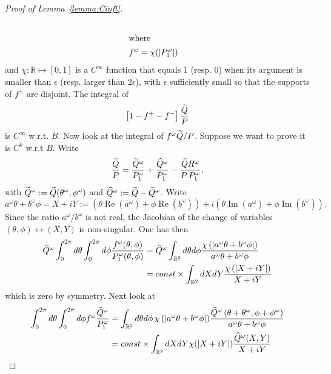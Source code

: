 \documentclass[AHL,Unicode,longabstracts,published]{cedram}
\newcommand{\bbR}{\mathbb{R}}
\DeclareMathOperator{\Rell}{Re}
\DeclareMathOperator{\Imm}{Im}
\let\oldtilde\tilde
\renewcommand*{\tilde}[1]{\mathchoice{\widetilde{#1}}{\widetilde{#1}}{\oldtilde{#1}}{\oldtilde{#1}}}
\let\oldhat\hat
\renewcommand*{\hat}[1]{\mathchoice{\widehat{#1}}{\widehat{#1}}{\oldhat{#1}}{\oldhat{#1}}}
\begin{document}
\begin{proof}[{Proof of Lemma~\ref{lemma:Cinft}}]
\begin{align}
\\
\intertext{where}
f^\omega &=\chi(|P^\omega_1|)
\end{align}
and $\chi:\bbR\mapsto [0,1]$ is a $C^\infty$ function that equals $1$ (resp. $0$) when its argument is smaller than $\epsilon$ (resp. larger than $2\epsilon$), with $\epsilon$ sufficiently small so that the supports of $f^\pm$ are disjoint. The integral of
\begin{equation}
\left[1-f^+-f^-\right]\frac{\tilde Q}P
\end{equation}
is $C^\infty$ w.r.t. $B$. Now look at the integral of $f^\omega \tilde Q/P$. Suppose we want to prove it is $C^k$ w.r.t $B$. Write
\begin{equation}\label{eq:Taylor}
\frac{\tilde Q}P=\frac{\tilde Q^\omega}{P^\omega_1}+\frac{\hat Q^\omega}{P^\omega_1}- \frac {\tilde Q R^\omega} { P\,P^\omega_1},
\end{equation}
with $\tilde Q^\omega:=\tilde Q(\theta^\omega,\phi^\omega)$ and $\hat Q^\omega:=\tilde Q-\tilde Q^\omega$. Write
\begin{equation}
a^\omega\theta+b^\omega\phi=X+i Y:=(\theta\Rell (a^\omega)+\phi\Rell(b^\omega))+i \left(\theta\Imm (a^\omega)+\phi\Imm(b^\omega)\right).
\end{equation}
Since the ratio $a^\omega/b^\omega$ is not real, the Jacobian of the change of variables $(\theta,\phi)\leftrightarrow (X,Y)$ is non-singular. One has then
\begin{equation}
\begin{aligned}
\tilde Q^\omega \int_0^{2\pi} d\theta \int_0^{2\pi}d\phi\frac{f^\omega(\theta,\phi)}{P^\omega_1(\theta,\phi)} &=\tilde Q^\omega\int_{\bbR^2} d\theta d\phi \frac{\chi\left(\left|a^\omega \theta+b^\omega\phi\right|\right) }{a^\omega\theta+b^\omega\phi}
\\ &=const\times \int_{\bbR^2} dX dY \frac{\chi\left(\left|X+i Y\right|\right)}{X+i Y}
\end{aligned}
\end{equation}
which is zero by symmetry. Next look at
\begin{align}
\int_0^{2\pi} d\theta \int_0^{2\pi}d\phi {f^\omega }\frac{\hat Q^\omega}{P^\omega_1}
&=\int_{\bbR^2} d\theta d\phi\,{\chi\left(\left|a^\omega \theta+b^\omega\phi\right|\right)}\frac{\hat Q^\omega \left(\theta+\theta^\omega,\phi+\phi^\omega\right)}{a^\omega\theta+b^\omega\phi}\\
&= const\times \int_{\bbR^2}dX dY\chi(|X+iY|) \frac{\hat Q^\omega(X,Y)}{X+i Y}\label{eq:dadc}
\end{align}

\end{proof}
\end{document}
